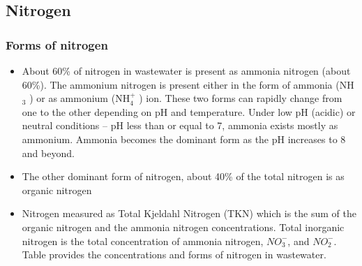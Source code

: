 	\subsection{Nitrogen}				

	\subsubsection{Forms of nitrogen}	
					      \begin{itemize}
					      	\item About 60\% of nitrogen in wastewater is present as ammonia nitrogen (about 60\%).  The ammonium nitrogen is present either in the form of ammonia (NH$_3$ ) or as ammonium (NH$_4^+$ ) ion.   These two forms can rapidly change from one to the other depending on pH and temperature.  Under low pH (acidic) or neutral conditions – pH less than or equal to 7, ammonia exists mostly as ammonium.  Ammonia becomes the dominant form as the pH increases to 8 and beyond.
					      	\item The other dominant form of nitrogen, about 40\% of the total nitrogen is as organic nitrogen
					      	\item Nitrogen measured as Total Kjeldahl Nitrogen (TKN) which is the sum of the organic nitrogen and the ammonia nitrogen concentrations.  Total inorganic nitrogen is the total concentration of ammonia nitrogen, $NO_3^{-}$, and $NO_2^{-}$.   Table provides the concentrations and forms of nitrogen in wastewater.
					      \end{itemize}
					      \setlength{\arrayrulewidth}{0.7mm}
					      \setlength{\tabcolsep}{8 pt}
					      \renewcommand{\arraystretch}{1.3}
